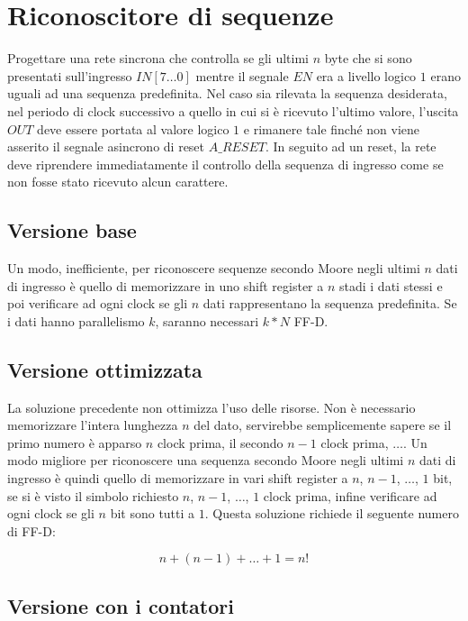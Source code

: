 \documentclass{subfiles}
\begin{document}
\section{Riconoscitore di sequenze}

Progettare una rete sincrona che controlla se gli ultimi $n$ byte che si sono presentati sull'ingresso $IN[7 \dots 0]$ mentre il segnale $EN$ era a livello logico $1$ erano uguali ad una sequenza predefinita.
Nel caso sia rilevata la sequenza desiderata, nel periodo di clock successivo a quello in cui si è ricevuto l'ultimo valore, l'uscita $OUT$ deve essere portata al valore logico $1$ e rimanere tale finché non viene asserito il segnale asincrono di reset $A\_RESET$.
In seguito ad un reset, la rete deve riprendere immediatamente il controllo della sequenza di ingresso come se non fosse stato ricevuto alcun carattere.

\subsection{Versione base}

Un modo, inefficiente, per riconoscere sequenze secondo Moore negli ultimi $n$ dati di ingresso è quello di memorizzare in uno shift register a $n$ stadi i dati stessi e poi verificare ad ogni clock se gli $n$ dati rappresentano la sequenza predefinita.
Se i dati hanno parallelismo $k$, saranno necessari $k * N$ FF-D.

\subsection{Versione ottimizzata}

La soluzione precedente non ottimizza l'uso delle risorse.
Non è necessario memorizzare l'intera lunghezza $n$ del dato, servirebbe semplicemente sapere se il primo numero è apparso $n$ clock prima, il secondo $n-1$ clock prima, $\dots$.
Un modo migliore per riconoscere una sequenza secondo Moore negli ultimi $n$ dati di ingresso è quindi quello di memorizzare in vari shift register a $n$, $n-1$, $\dots$, $1$ bit, se si è visto il simbolo richiesto $n$, $n-1$, $\dots$, $1$ clock prima, infine verificare ad ogni clock se gli $n$ bit sono tutti a $1$.
Questa soluzione richiede il seguente numero di FF-D:

$$
n + (n-1) + \dots + 1 = n!
$$

\subsection{Versione con i contatori}
\end{document}
